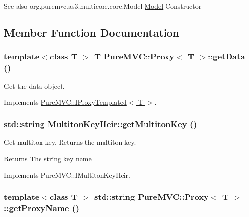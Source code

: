 \begin{DoxySeeAlso}{See also}
org.puremvc.as3.multicore.core.Model \hyperlink{class_pure_m_v_c_1_1_model}{Model} Constructor 
\end{DoxySeeAlso}


\subsection{Member Function Documentation}
\hypertarget{class_pure_m_v_c_1_1_proxy_a717242b7e7053d768d08ac5972ab8688}{
\subsubsection[{getData}]{\setlength{\rightskip}{0pt plus 5cm}template$<$class T $>$ T {\bf PureMVC::Proxy}$<$ T $>$::getData ()}}
\label{class_pure_m_v_c_1_1_proxy_a717242b7e7053d768d08ac5972ab8688}


Get the data object. 

Implements \hyperlink{class_pure_m_v_c_1_1_i_proxy_templated_ab6cf7f1c41002c84a7f48d65b0d2e388}{PureMVC::IProxyTemplated$<$ T $>$}.\hypertarget{class_pure_m_v_c_1_1_multiton_key_heir_aa5622459d33380deb08dc3cab8b991c7}{
\subsubsection[{getMultitonKey}]{\setlength{\rightskip}{0pt plus 5cm}std::string MultitonKeyHeir::getMultitonKey ()}}
\label{class_pure_m_v_c_1_1_multiton_key_heir_aa5622459d33380deb08dc3cab8b991c7}


Get multiton key. Returns the multiton key. \begin{DoxyReturn}{Returns}
The string key name 
\end{DoxyReturn}


Implements \hyperlink{class_pure_m_v_c_1_1_i_multiton_key_heir_aecccfb9898368c6377550ceae5730934}{PureMVC::IMultitonKeyHeir}.\hypertarget{class_pure_m_v_c_1_1_proxy_a1aad6dd9244cd07361afb0bb5829b09d}{
\subsubsection[{getProxyName}]{\setlength{\rightskip}{0pt plus 5cm}template$<$class T $>$ std::string {\bf PureMVC::Proxy}$<$ T $>$::getProxyName ()}}
\label{class_pure_m_v_c_1_1_proxy_a1aad6dd9244cd07361afb0bb5829b09d}


